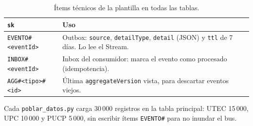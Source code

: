 \begin{table}[htbp]
\centering\small
\begin{tabularx}{\textwidth}{lX}
\toprule
\texttt{sk} & Uso \\
\midrule
\texttt{EVENTO\#<eventId>} & Outbox: \texttt{source}, \texttt{detailType}, \texttt{detail} (JSON) y \texttt{ttl} de 7 días. Lo lee el Stream. \\
\texttt{INBOX\#<eventId>} & Inbox del consumidor: marca el evento como procesado (idempotencia). \\
\texttt{AGG\#<tipo>\#<id>} & Última \texttt{aggregateVersion} vista, para descartar eventos viejos. \\
\bottomrule
\end{tabularx}
\caption{Ítems técnicos de la plantilla en todas las tablas.}
\end{table}

Cada \texttt{poblar\_datos.py} carga 30\,000 registros en la tabla principal: UTEC 15\,000, UPC
10\,000 y PUCP 5\,000, sin escribir ítems \texttt{EVENTO\#} para no inundar el bus.







